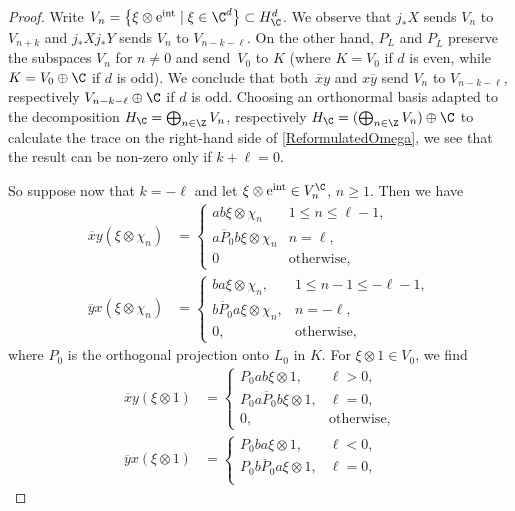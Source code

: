 \begin{proof}
Write $V_n = \big\{\xi \otimes {\rm e}^{\rm int} \mid \xi \in \C^d\big\} \subset H^d_\C$.
We observe that $j_*X$ sends $V_n$ to $V_{n+k}$ and $j_*Xj_*Y$ sends $V_n$ to $V_{n-k-\ell}$.
On the other hand, $P_L$ and $P_{\overline{L}}$ preserve the subspaces $V_n$ for $n \neq 0$ and send~$V_0$ to $K$ (where $K = V_0$ if $d$ is even, while $K = V_0 \oplus \C$ if $d$ is odd).
We conclude that both~$\overline{x} y$ and $x \overline{y}$ send $V_n$ to $V_{n-k-\ell}$, respectively $V_{n-k-\ell} \oplus \C$ if $d$ is odd.
Choosing an orthonormal basis adapted to the decomposition $H_\C = \bigoplus_{n \in \Z} V_n$, respectively $H_\C = (\bigoplus_{n \in \Z} V_n) \oplus \C$ to calculate the trace on the right-hand side of \eqref{ReformulatedOmega}, we see that the result can be non-zero only if $k+\ell = 0$.

So suppose now that $k = - \ell$ and let $\xi \otimes {\rm e}^{{\rm int}} \in V_n^\C$, $n \geq 1$. Then we have
\begin{align*}
 \overline{x}y(\xi\otimes \chi_n) &=
 \begin{cases}
 ab\xi \otimes \chi_{n} & 1 \leq n \leq \ell -1, \\
 a\overline{P}_0b\xi \otimes \chi_{n} & n = \ell,\\
 0 & \text{otherwise},
 \end{cases}
 \\
 \overline{y}x(\xi \otimes \chi_n) &=
 \begin{cases}
 ba\xi \otimes \chi_{n}, & 1 \leq n -1 \leq -\ell -1, \\
 b\overline{P}_0a\xi \otimes \chi_{n}, & n = - \ell,\\
 0, & \text{otherwise},
 \end{cases}	
\end{align*}
where $P_0$ is the orthogonal projection onto $L_0$ in $K$.
For $\xi \otimes 1 \in V_0$, we find
\begin{align*}
 \overline{x}y(\xi\otimes 1) &=
 \begin{cases}
 P_0ab\xi \otimes 1, & \ell > 0, \\
 P_0a\overline{P}_0b\xi \otimes 1, & \ell = 0,\\
 0, & \text{otherwise},
 \end{cases}
 \\
 \overline{y}x(\xi \otimes 1) &=
 \begin{cases}
 P_0ba\xi \otimes 1, & \ell < 0, \\
 P_0b\overline{P}_0a\xi \otimes 1, & \ell = 0,\\

\end{cases}
\end{align*}
\end{proof}
